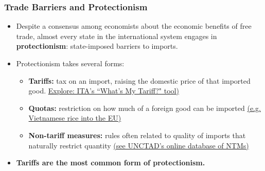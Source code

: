 \documentclass{beamer}
\begin{document}
\begin{frame} 
	\frametitle{\LARGE{Trade Barriers and Protectionism}}
	\begin{itemize}
		\item Despite a consensus among economists about the economic benefits of free trade, almost every state in the international system engages in \textbf{protectionism}: state-imposed barriers to imports. \pause
		\item Protectionism takes several forms:
		\begin{itemize}
			\item \textbf{Tariffs:} tax on an import, raising the domestic price of that imported good. \href{https://beta.trade.gov/fta/tariff-rates-search}{Explore: ITA's ``What's My Tariff?" tool)} \pause
			\item \textbf{Quotas:} restriction on how much of a foreign good can be imported \href{https://en.vietnamplus.vn/nine-vietnamese-rice-varieties-given-tariff-quotas-in-eu/182888.vnp}{(e.g. Vietnamese rice into the EU)} \pause
			\item \textbf{Non-tariff measures:} rules often related to quality of imports that naturally restrict quantity \href{https://trains.unctad.org/}{(see UNCTAD's online database of NTMs)} 
		\end{itemize}
		\item \textbf{Tariffs are the most common form of protectionism.}
	\end{itemize}
\end{frame}
\end{document}
